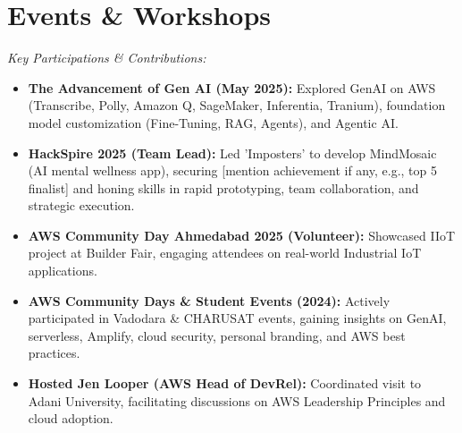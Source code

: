 \documentclass[10pt,a4paper]{article}
\begin{document}
\section*{Events \& Workshops}
\textit{Key Participations & Contributions:}
\begin{itemize}
    \item \textbf{The Advancement of Gen AI (May 2025):} Explored GenAI on AWS (Transcribe, Polly, Amazon Q, SageMaker, Inferentia, Tranium), foundation model customization (Fine-Tuning, RAG, Agents), and Agentic AI.
    \item \textbf{HackSpire 2025 (Team Lead):} Led 'Imposters' to develop MindMosaic (AI mental wellness app), securing [mention achievement if any, e.g., top 5 finalist] and honing skills in rapid prototyping, team collaboration, and strategic execution.
    \item \textbf{AWS Community Day Ahmedabad 2025 (Volunteer):} Showcased IIoT project at Builder Fair, engaging attendees on real-world Industrial IoT applications.
    \item \textbf{AWS Community Days \& Student Events (2024):} Actively participated in Vadodara & CHARUSAT events, gaining insights on GenAI, serverless, Amplify, cloud security, personal branding, and AWS best practices.
    \item \textbf{Hosted Jen Looper (AWS Head of DevRel):} Coordinated visit to Adani University, facilitating discussions on AWS Leadership Principles and cloud adoption.
\end{itemize}
\end{document}
